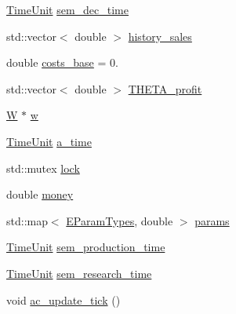 {\bf }\par
\begin{DoxyCompactItemize}
\item 
\hyperlink{namespacesolar__core_a4b5949d07259da6f8a20d12a30403e90}{Time\+Unit} \hyperlink{classsolar__core_1_1_s_e_m_a37a50821d1926b9028e70431fb383a7a}{sem\+\_\+dec\+\_\+time}
\item 
std\+::vector$<$ double $>$ \hyperlink{classsolar__core_1_1_s_e_m_ab3d8795e8601541ebcefcaf76d77c67a}{history\+\_\+sales}
\item 
double \hyperlink{classsolar__core_1_1_s_e_m_a923827d4aefd8df93e1e49944f96a6be}{costs\+\_\+base} = 0.
\item 
std\+::vector$<$ double $>$ \hyperlink{classsolar__core_1_1_s_e_m_a42278e550f44276e0bb6c966f37c0033}{T\+H\+E\+T\+A\+\_\+profit}
\end{DoxyCompactItemize}

\begin{DoxyCompactItemize}
\item 
\hyperlink{classsolar__core_1_1_w}{W} $\ast$ \hyperlink{classsolar__core_1_1_s_e_m_a6ef9eb7ba22b2c76c73635843b6cac4e}{w}
\item 
\hyperlink{namespacesolar__core_a4b5949d07259da6f8a20d12a30403e90}{Time\+Unit} \hyperlink{classsolar__core_1_1_s_e_m_a522bb3ecb869a396a797765c9078de12}{a\+\_\+time}
\item 
std\+::mutex \hyperlink{classsolar__core_1_1_s_e_m_a4b62648f9638185e279a801b8c0eb39b}{lock}
\item 
double \hyperlink{classsolar__core_1_1_s_e_m_ac2c452b6783b521c59d3b82dba6d08cb}{money}
\item 
std\+::map$<$ \hyperlink{namespacesolar__core_aa1147341e5ef7a40d68d1bd68e149362}{E\+Param\+Types}, double $>$ \hyperlink{classsolar__core_1_1_s_e_m_a52adde99943cf97f4a024927ca57c087}{params}
\item 
\hyperlink{namespacesolar__core_a4b5949d07259da6f8a20d12a30403e90}{Time\+Unit} \hyperlink{classsolar__core_1_1_s_e_m_aa4a21386cf6942df0b5e501a2588aaad}{sem\+\_\+production\+\_\+time}
\item 
\hyperlink{namespacesolar__core_a4b5949d07259da6f8a20d12a30403e90}{Time\+Unit} \hyperlink{classsolar__core_1_1_s_e_m_a89e5a54de1bb68b94f176e6585a23148}{sem\+\_\+research\+\_\+time}
\item 
void \hyperlink{classsolar__core_1_1_s_e_m_a5c40b26576923ee560a73aeeed31685c}{ac\+\_\+update\+\_\+tick} ()
\end{DoxyCompactItemize}


